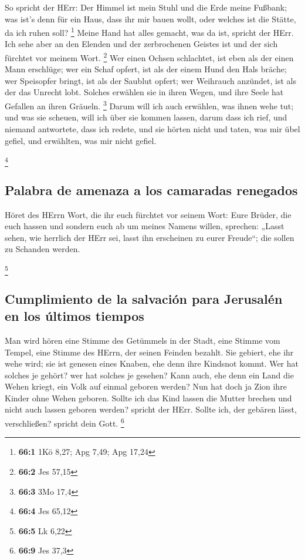  So spricht der HErr: Der Himmel ist mein Stuhl und die
Erde meine Fußbank; was ist's denn für ein Haus, dass ihr mir bauen
wollt, oder welches ist die Stätte, da ich ruhen soll? \footnote{\textbf{66:1}
  1Kö 8,27; Apg 7,49; Apg 17,24}  Meine Hand hat alles
gemacht, was da ist, spricht der HErr. Ich sehe aber an den Elenden und
der zerbrochenen Geistes ist und der sich fürchtet vor meinem Wort.
\footnote{\textbf{66:2} Jes 57,15}  Wer einen Ochsen
schlachtet, ist eben als der einen Mann erschlüge; wer ein Schaf opfert,
ist als der einem Hund den Hals bräche; wer Speisopfer bringt, ist als
der Saublut opfert; wer Weihrauch anzündet, ist als der das Unrecht
lobt. Solches erwählen sie in ihren Wegen, und ihre Seele hat Gefallen
an ihren Gräueln. \footnote{\textbf{66:3} 3Mo 17,4}  Darum
will ich auch erwählen, was ihnen wehe tut; und was sie scheuen, will
ich über sie kommen lassen, darum dass ich rief, und niemand antwortete,
dass ich redete, und sie hörten nicht und taten, was mir übel gefiel,
und erwählten, was mir nicht gefiel.

\footnote{\textbf{66:4} Jes 65,12}

\hypertarget{palabra-de-amenaza-a-los-camaradas-renegados}{%
\subsection{Palabra de amenaza a los camaradas
renegados}\label{palabra-de-amenaza-a-los-camaradas-renegados}}

 Höret des HErrn Wort, die ihr euch fürchtet vor seinem
Wort: Eure Brüder, die euch hassen und sondern euch ab um meines Namens
willen, sprechen: „Lasst sehen, wie herrlich der HErr sei, lasst ihn
erscheinen zu eurer Freude``; die sollen zu Schanden werden.

\footnote{\textbf{66:5} Lk 6,22}

\hypertarget{cumplimiento-de-la-salvaciuxf3n-para-jerusaluxe9n-en-los-uxfaltimos-tiempos}{%
\subsection{Cumplimiento de la salvación para Jerusalén en los últimos
tiempos}\label{cumplimiento-de-la-salvaciuxf3n-para-jerusaluxe9n-en-los-uxfaltimos-tiempos}}

 Man wird hören eine Stimme des Getümmels in der Stadt,
eine Stimme vom Tempel, eine Stimme des HErrn, der seinen Feinden
bezahlt.  Sie gebiert, ehe ihr wehe wird; sie ist genesen
eines Knaben, ehe denn ihre Kindsnot kommt.  Wer hat
solches je gehört? wer hat solches je gesehen? Kann auch, ehe denn ein
Land die Wehen kriegt, ein Volk auf einmal geboren werden? Nun hat doch
ja Zion ihre Kinder ohne Wehen geboren.  Sollte ich das
Kind lassen die Mutter brechen und nicht auch lassen geboren werden?
spricht der HErr. Sollte ich, der gebären lässt, verschließen? spricht
dein Gott. \footnote{\textbf{66:9} Jes 37,3}

